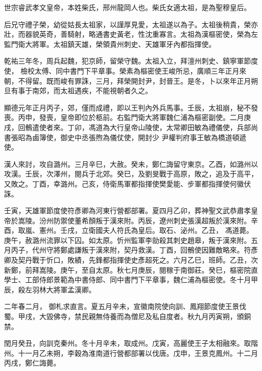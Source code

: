 
\begin{pinyinscope}

 世宗睿武孝文皇帝，本姓柴氏，邢州龍岡人也。柴氏女適太祖，是為聖穆皇后。



 后兄守禮子榮，幼從姑長太祖家，以謹厚見愛，太祖遂以為子。太祖後稍貴，榮亦壯，而器貌英奇，善騎射，略通書史黃老，性沈重寡言。太祖為漢樞密使，榮為左監門衛大將軍。太祖鎮天雄，榮領貴州刺史、天雄軍牙內都指揮使。



 乾祐三年冬，周兵起魏，犯京師，留榮守魏。太祖入立，拜澶州刺史、鎮寧軍節度使，
 檢校太傅、同中書門下平章事。榮素為樞密使王峻所忌，廣順三年正月來朝，不得留。既而峻有罪誅，三月，拜榮開封尹，封晉王。是冬，卜以來年正月朔旦有事于南郊，而太祖遇疾，不能視朝者久之。



 顯德元年正月丙子，郊，僅而成禮，即以王判內外兵馬事。壬辰，太祖崩，秘不發喪。丙申，發喪，皇帝即位於柩前。右監門衛大將軍魏仁浦為樞密副使。二月庚戌，回鶻遣使者來。丁卯，馮道為大行皇帝山陵使，太常卿田敏為禮儀使，兵部尚書張昭為鹵簿使，御史中丞張煦為儀仗使，開封少
 尹權判府事王敏為橋道頓遞使。



 漢人來討，攻自潞州。三月辛巳，大赦。癸未，鄭仁誨留守東京。乙酉，如潞州以攻漢。壬辰，次澤州，閱兵于北郊。癸巳，及劉旻戰于高原，敗之，追及于高平，又敗之。丁酉，幸潞州。己亥，侍衛馬軍都指揮使樊愛能、步軍都指揮使何徽伏誅。



 壬寅，天雄軍節度使符彥卿為河東行營都部署。夏四月乙卯，葬神聖文武恭肅孝皇帝於嵩陵。汾州防禦使董希顏叛于漢來附。丙辰，遼州刺史張漢超叛於漢來附。辛酉，取嵐、憲州。壬戌，立衛國夫人符氏為皇后。取石、泌州。乙丑，
 馮道薨。庚午，赦潞州流罪以下囚。如太原。忻州監軍李勍殺其刺史趙皋，叛于漢來附。五月丙子，代州守將鄭處謙叛于漢來附，契丹救漢。丁酉，回鶻使因難敵略來。符彥卿及契丹戰于忻口，敗績，先鋒都指揮使史彥超死之。六月乙巳，班師。乙丑，次新鄭，前拜嵩陵。庚午，至自太原。秋七月庚辰，閱稼于南御莊。癸巳，樞密院直學士、工部侍郎景範為中書侍郎、同中書門下平章事，魏仁浦為樞密使。冬十月甲辰，殺左羽林大將軍孟漢卿。



 二年春二月，
 御札求直言。夏五月辛未，宣徽南院使向訓、鳳翔節度使王景伐蜀。甲戌，大毀佛寺，禁民親無侍養而為僧尼及私自度者。秋九月丙寅朔，頒銅禁。



 閏月癸丑，向訓克秦州。冬十月辛未，取成州。戊寅，高麗使王子太相融來。取階州。十一月乙未朔，李穀為淮南道行營都部署以伐唐。戊申，王景克鳳州。十二月丙戌，鄭仁誨薨。




\end{pinyinscope}
